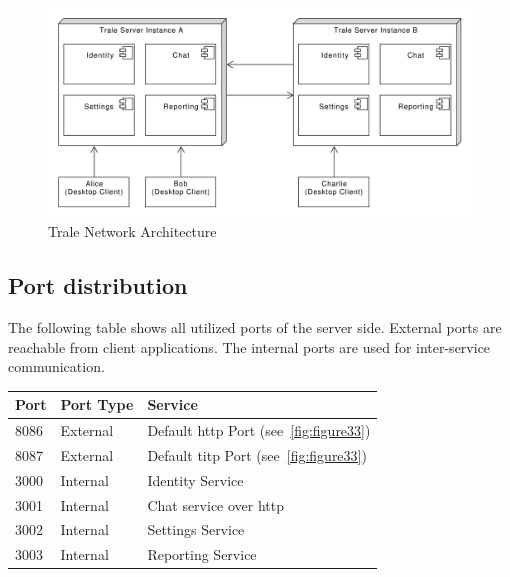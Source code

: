 \begin{figure}[H]
    \centering
    \includegraphics[width=1.0\textwidth]{./graphics/components}
    \caption{Trale Network Architecture}
    \label{fig:figure32}
\end{figure}

\pagebreak
\subsection{Port distribution}\label{subsec:port-distribution}

The following table shows all utilized ports of the server side.
External ports are reachable from client applications.
The internal ports are used for inter-service communication.
\begin{table}[H]
    \centering
    \begin{tabular}{|l|l|l|}
        \toprule
        \textbf{Port} & \textbf{Port Type} & \textbf{Service}                               \\
        \midrule
        8086          & External & Default \ac{http} Port (see~\ref{fig:figure33})     \\
        \midrule
        8087          & External & Default \ac{titp} Port (see~\ref{fig:figure33})     \\
        \midrule
        3000          & Internal & Identity Service                               \\
        \midrule
        3001          & Internal & Chat service over \ac{http}                         \\
        \midrule
        3002          & Internal & Settings Service \\
        \midrule
        3003          & Internal & Reporting Service \\
        \bottomrule
    \end{tabular}\label{tab:table}
\end{table}

